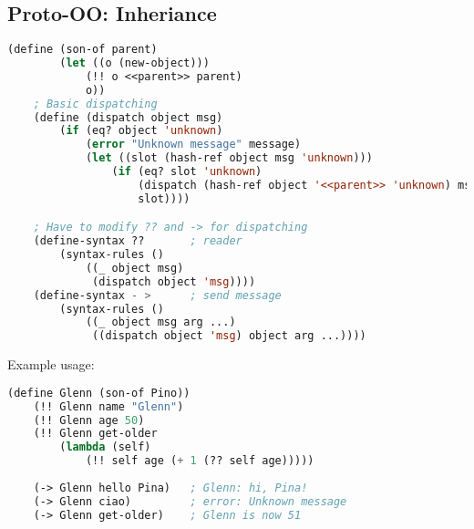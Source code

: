 \subsection{Proto-OO: Inheriance}
\begin{lstlisting}[language=Lisp]
    (define (son-of parent)
        (let ((o (new-object)))
            (!! o <<parent>> parent)
            o))
    ; Basic dispatching
    (define (dispatch object msg)
        (if (eq? object 'unknown)
            (error "Unknown message" message)
            (let ((slot (hash-ref object msg 'unknown)))
                (if (eq? slot 'unknown)
                    (dispatch (hash-ref object '<<parent>> 'unknown) msg)
                    slot))))

    ; Have to modify ?? and -> for dispatching
    (define-syntax ??       ; reader
        (syntax-rules ()
            ((_ object msg)
             (dispatch object 'msg))))
    (define-syntax - >      ; send message
        (syntax-rules ()
            ((_ object msg arg ...)
             ((dispatch object 'msg) object arg ...))))
\end{lstlisting}
Example usage:
\begin{lstlisting}[language=Lisp]
    (define Glenn (son-of Pino))
    (!! Glenn name "Glenn")
    (!! Glenn age 50)
    (!! Glenn get-older
        (lambda (self)
            (!! self age (+ 1 (?? self age)))))
    
    (-> Glenn hello Pina)   ; Glenn: hi, Pina!
    (-> Glenn ciao)         ; error: Unknown message
    (-> Glenn get-older)    ; Glenn is now 51
\end{lstlisting}